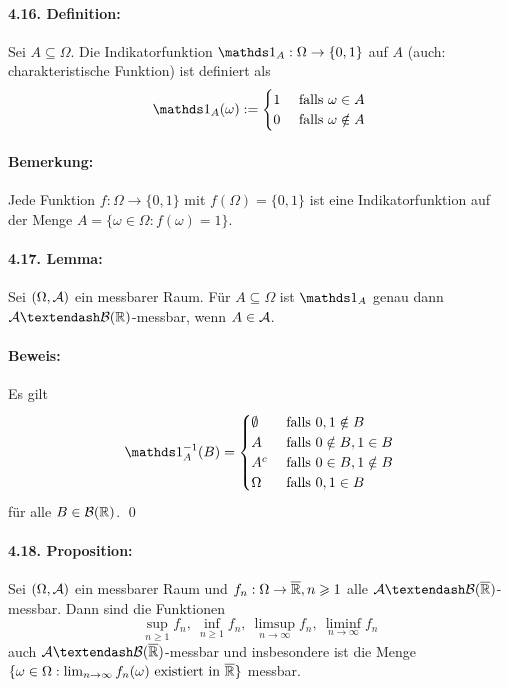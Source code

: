 \documentclass[12pt]{report}
\begin{document}
 \paragraph{4.16. Definition:}Sei $A\subseteq\Omega$. Die Indikatorfunktion $\ind{A}:\Omega\to\{0,1\}$ auf $A$ (auch: charakteristische Funktion) ist definiert als
 \begin{align*}
     \ind{A}(\omega):=
     \begin{cases}
         1&\text{ falls }\omega\in A \\
         0&\text{ falls }\omega\notin A
     \end{cases}
 \end{align*}
 
 \paragraph{Bemerkung:}Jede Funktion $f:\Omega\to\{0,1\}$ mit $f(\Omega)=\{0,1\}$ ist eine Indikatorfunktion auf der Menge $A=\{\omega\in\Omega:f(\omega)=1\}$.
 
 \paragraph{4.17. Lemma:}Sei $(\Omega,\mathcal{A})$ ein messbarer Raum. F\"ur $A\subseteq\Omega$ ist $\ind{A}$ genau dann $\A\textendash\borel$-messbar, wenn $A\in\mathcal{A}$.
 
 \paragraph{Beweis:}Es gilt
 \begin{align*}
     \ind{A}^{-1}(B)=
     \begin{cases}
         \emptyset&\text{ falls }0,1\notin B\\
         A&\text{ falls }0\notin B, 1\in B \\
         A^c&\text{ falls }0\in B, 1\notin B \\
         \Omega&\text{ falls }0,1\in B
     \end{cases}
 \end{align*}
 f\"ur alle $B\in\mathcal{B}(\mathbb{R})$. \qed
 
 \paragraph{4.18. Proposition:}Sei $(\Omega,\mathcal{A})$ ein messbarer Raum und $f_n:\Omega\to\overline{\mathbb{R}},n\geqslant1$ alle $\A\textendash\cB(\overline\R)$-messbar. Dann sind die Funktionen 
 $$\sup_{n\geq1}f_n,\ \inf_{n\geq1}f_n,\ \limsup_{n\to\infty}f_n,\ \liminf_{n\to\infty}f_n$$
 auch $\A\textendash\cB(\overline\R)$-messbar und insbesondere ist die Menge $\{\omega\in\Omega:\lim_{n\to\infty}f_n(\omega)\text{ existiert in }\overline{\mathbb{R}}\}$ messbar.
 
\end{document}
